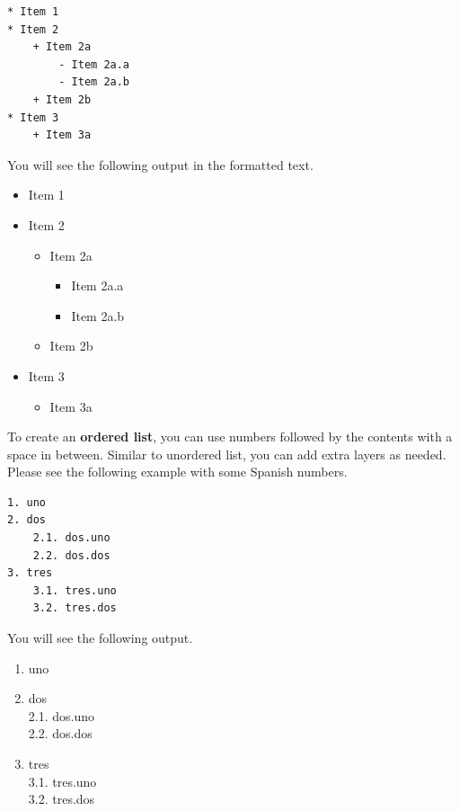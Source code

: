 \documentclass[
]{book}
\providecommand{\tightlist}{%
  \setlength{\itemsep}{0pt}\setlength{\parskip}{0pt}}
\begin{document}
\begin{verbatim}
* Item 1
* Item 2
    + Item 2a
        - Item 2a.a
        - Item 2a.b
    + Item 2b
* Item 3
    + Item 3a
\end{verbatim}

You will see the following output in the formatted text.

\begin{itemize}
\tightlist
\item
  Item 1
\item
  Item 2

  \begin{itemize}
  \tightlist
  \item
    Item 2a

    \begin{itemize}
    \tightlist
    \item
      Item 2a.a
    \item
      Item 2a.b
    \end{itemize}
  \item
    Item 2b
  \end{itemize}
\item
  Item 3

  \begin{itemize}
  \tightlist
  \item
    Item 3a
  \end{itemize}
\end{itemize}

To create an \textbf{ordered list}, you can use numbers followed by the contents with a space in between. Similar to unordered list, you can add extra layers as needed. Please see the following example with some Spanish numbers.

\begin{verbatim}
1. uno                                           
2. dos                                            
    2.1. dos.uno  
    2.2. dos.dos  
3. tres                                            
    3.1. tres.uno  
    3.2. tres.dos  
\end{verbatim}

You will see the following output.

\begin{enumerate}
\def\labelenumi{\arabic{enumi}.}
\tightlist
\item
  uno\\
\item
  dos\\
  2.1. dos.uno\\
  2.2. dos.dos\\
\item
  tres\\
  3.1. tres.uno\\
  3.2. tres.dos
\end{enumerate}
\end{document}
